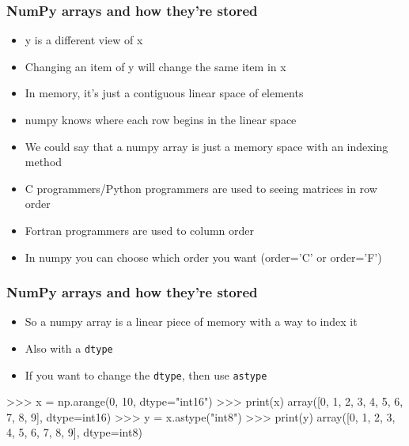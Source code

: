 \documentclass{beamer}
\begin{document}
\begin{frame}[fragile]
\frametitle{NumPy arrays and how they're stored}
\begin{itemize}
\item y is a different view of x
\item Changing an item of y will change the same item in x
\item In memory, it's just a contiguous linear space of elements
\item numpy knows where each row begins in the linear space
\item We could say that a numpy array is just a memory space with an
  indexing method
\item C programmers/Python programmers are used to seeing matrices in row order
\item Fortran programmers are used to column order
\item In numpy you can choose which order you want (order='C' or order='F')
\end{itemize}
\end{frame}

\begin{frame}[fragile]
\frametitle{NumPy arrays and how they're stored}
\begin{itemize}
\item So a numpy array is a linear piece of memory with a way to index it
\item Also with a \texttt{dtype}
\item If you want to change the \texttt{dtype}, then use \texttt{astype}
\end{itemize}
\begin{code}
>>> x = np.arange(0, 10, dtype="int16")
>>> print(x)
array([0, 1, 2, 3, 4, 5, 6, 7, 8, 9], dtype=int16)
>>> y = x.astype("int8")
>>> print(y)
array([0, 1, 2, 3, 4, 5, 6, 7, 8, 9], dtype=int8)
\end{code}
\end{frame}
\end{document}
